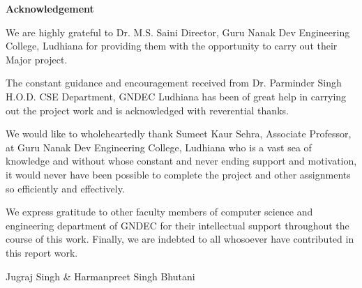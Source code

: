 \begin{center}
	\Huge \textbf{Acknowledgement}
\end{center}
We are highly grateful to Dr. M.S. Saini Director, Guru Nanak Dev Engineering College, Ludhiana for providing them with the opportunity to carry out their Major project.

The constant guidance and encouragement received from Dr. Parminder Singh H.O.D. CSE Department, GNDEC Ludhiana has been of great help in carrying out the project work and is acknowledged with reverential thanks.

We would like to wholeheartedly thank Sumeet Kaur Sehra, Associate Professor, at Guru Nanak Dev Engineering College, Ludhiana who is a vast sea of knowledge and without whose constant and never ending support and motivation, it would never have been possible to complete the project and other assignments so efficiently and effectively.

We express gratitude to other faculty members of computer science and engineering department of GNDEC for their intellectual support throughout the course of this work.   Finally, we are indebted to all whosoever have contributed in this report work.

\vskip 1.0cm 
\noindent Jugraj Singh \& Harmanpreet Singh Bhutani